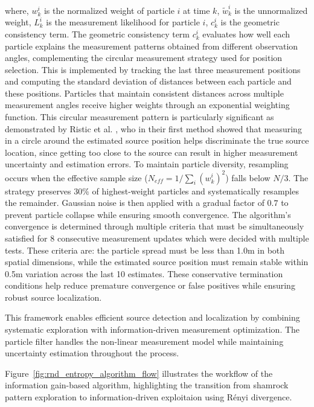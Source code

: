 \documentclass[../report.tex]{subfiles}
\begin{document}
    where, $w_k^i$ is the normalized weight of particle $i$ at time $k$, $\tilde{w}_k^i$ is the unnormalized weight, $L_k^i$ is the measurement likelihood for particle $i$, $c_k^i$ is the geometric 
    consistency term. The geometric consistency term $c_k^i$ evaluates how well each particle explains the measurement patterns obtained from different observation angles, complementing the circular 
    measurement strategy used for position selection. This is implemented by tracking the last three measurement positions and computing the standard deviation of distances between each particle and 
    these positions. Particles that maintain consistent distances across multiple measurement angles receive higher weights through an exponential weighting function. This circular measurement pattern 
    is particularly significant as demonstrated by Ristic et al. \cite{Ristic2007AnIG}, who in their first method showed that measuring in a circle around the estimated source position helps 
    discriminate the true source location, since getting too close to the source can result in higher measurement uncertainty and estimation errors. To maintain particle diversity, resampling occurs when the effective sample size ($N_{eff} = 1/\sum_i(w_k^i)^2$) falls below $N/3$. The strategy preserves $30\%$ of highest-weight
    particles and systematically resamples the remainder. Gaussian noise is then applied with a gradual factor of $0.7$ to prevent particle collapse while ensuring 
    smooth convergence. The algorithm's convergence is determined through multiple criteria that must be simultaneously satisfied for 8 consecutive measurement updates which were decided with
    multiple tests. These criteria are: the particle spread must be less than 1.0m in both spatial dimensions, while the estimated source position must remain stable within 0.5m variation across 
    the last 10 estimates. These conservative termination conditions help reduce premature convergence or false positives while ensuring robust source localization.

    This framework enables efficient source detection and localization by combining systematic exploration with information-driven measurement optimization. The particle filter handles the 
    non-linear measurement model while maintaining uncertainty estimation throughout the process.

    Figure~\ref{fig:rnd_entropy_algorithm_flow} illustrates the workflow of the information gain-based algorithm, highlighting the transition from shamrock pattern 
    exploration to information-driven exploitaion using Rényi divergence.
\end{document}

